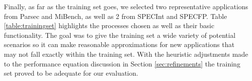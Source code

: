 Finally, as far as the training set goes, we selected two representative applications from
Parsec and MiBench, as well as 2 from SPECInt and SPECFP. Table \ref{table:trainingset}
highlights the processes chosen as well as their basic functionality. The goal 
was to give the training set a wide variety of potential scenarios so it can 
make reasonable approximations for new applications that may not fall exactly 
within the training set. With the heuristic adjustments made to the performance
equation discussion in Section \ref{sec:refinements} the training set proved to
be adequate for our evaluation.







